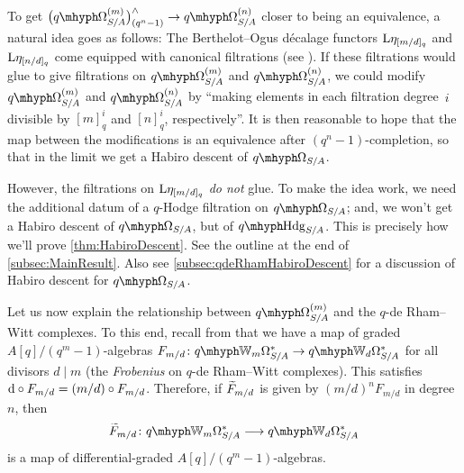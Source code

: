 \documentclass[DIV=12,numbers=enddot,leqno,bibliography=totoc]{scrartcl}
\begin{document}
	\begin{rem}\label{rem:qOmegaHabiroDescent}
		To get $\bigl(\qOmega_{S/A}^{(m)}\bigr)_{(q^n-1)}^\complete\rightarrow \qOmega_{S/A}^{(n)}$ closer to being an equivalence, a natural idea goes as follows: The Berthelot--Ogus décalage functors $\mathrm{L}\eta_{[m/d]_q}$ and $\mathrm{L}\eta_{[n/d]_q}$ come equipped with canonical filtrations (see \cite[Proposition~]{BMS2}). If these filtrations would glue to give filtrations on $\qOmega_{S/A}^{(m)}$ and $\qOmega_{S/A}^{(n)}$, we could modify $\qOmega_{S/A}^{(m)}$ and $\qOmega_{S/A}^{(n)}$ by \enquote{making elements in each filtration degree~$i$ divisible by $[m]_q^i$ and $[n]_q^i$, respectively}. It is then reasonable to hope that the map between the modifications is an equivalence after $(q^n-1)$-completion, so that in the limit we get a Habiro descent of $\qOmega_{S/A}$.
		
		However, the filtrations on $\mathrm{L}\eta_{[m/d]_q}$ \emph{do not} glue. To make the idea work, we need the additional datum of a $q$-Hodge filtration on $\qOmega_{S/A}$; and, we won't get a Habiro descent of $\qOmega_{S/A}$, but of $\qHodge_{S/A}$. This is precisely how we'll prove \cref{thm:HabiroDescent}. See the outline at the end of \cref{subsec:MainResult}. Also see \cref{subsec:qdeRhamHabiroDescent} for a discussion of Habiro descent for $\qOmega_{S/A}$.
	\end{rem}
	Let us now explain the relationship between $\qOmega_{S/A}^{(m)}$ and the $q$-de Rham--Witt complexes. To this end, recall from \cite[Proposition~]{qWitt} that we have a map of graded $A[q]/(q^m-1)$-algebras $F_{m/d}\colon \qIW_m\Omega_{S/A}^*\rightarrow \qIW_d\Omega_{S/A}^*$ for all divisors $d\mid m$ (the \emph{Frobenius} on $q$-de Rham--Witt complexes). This satisfies $\mathop{}\!\mathrm{d} \circ F_{m/d}=(m/d)\circ F_{m/d}$. Therefore, if $\overtilde{F}_{m/d}$ is given by $(m/d)^nF_{m/d}$ in degree~$n$, then
	\begin{equation*}
		\overtilde{F}_{m/d}\colon \qIW_m\Omega_{S/A}^*\longrightarrow \qIW_d\Omega_{S/A}^*
	\end{equation*}
	is a map of differential-graded $A[q]/(q^m-1)$-algebras.
	
\end{document}
